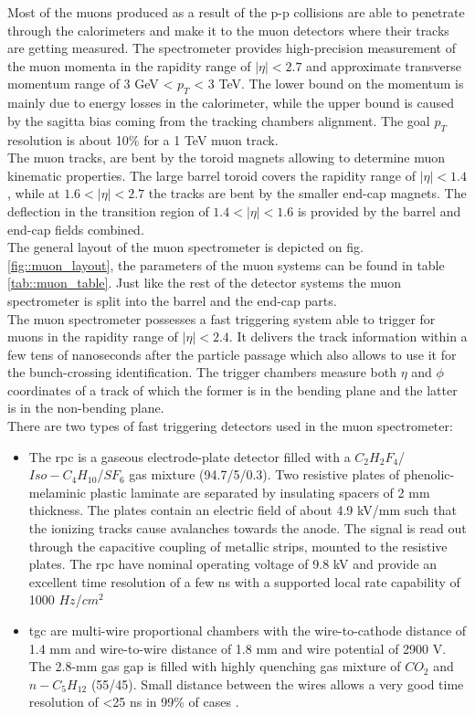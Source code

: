 	Most of the muons produced as a result of the p-p collisions are able to penetrate through the calorimeters and make it to the muon detectors where their tracks are getting measured. The spectrometer provides high-precision measurement of the muon momenta in the rapidity range of $|\eta| < 2.7$ and approximate transverse momentum range of 3 GeV < $p_T$ < 3 TeV. The lower bound on the momentum is mainly due to energy losses in the calorimeter, while the upper bound is caused by the sagitta bias coming from the tracking chambers alignment. The goal $p_T$ resolution is about 10\% for a 1 TeV muon track. \\
	The muon tracks\cite{muons_1},\cite{muons_2}  are bent by the toroid magnets allowing to determine muon kinematic properties. The large barrel toroid covers the rapidity range of $|\eta| < 1.4$, while at  $1.6 < |\eta| < 2.7$ the tracks are bent by the smaller end-cap magnets. The deflection in the transition region of $1.4 < |\eta| < 1.6$ is provided by the barrel and end-cap fields combined.\\
	The general layout of the muon spectrometer is depicted on fig. \ref{fig::muon_layout}, the parameters of the muon systems can be found in table \ref{tab::muon_table}. Just like the rest of the detector systems the muon spectrometer is split into the barrel and the end-cap parts. \\ 
	The muon spectrometer possesses a fast triggering system able to trigger for muons in the rapidity range of $|\eta| < 2.4$. It delivers the track information within a few tens of nanoseconds after the particle passage which also allows to use it for the bunch-crossing identification. The trigger chambers measure both $\eta$ and $\phi$ coordinates of a track of which the former is in the bending plane and the latter is in the non-bending plane.\\ 
	There are two types of fast triggering detectors used in the muon spectrometer:
		\begin{itemize}
		\item The \gls{rpc} is a gaseous electrode-plate detector filled with a $C_2H_2F_4$/$Iso-C_4H_{10}$/$SF_6$ gas mixture (94.7/5/0.3). Two resistive plates of phenolic-melaminic plastic laminate are separated by insulating spacers of 2 mm thickness. The plates contain an electric field of about 4.9 kV/mm such that the ionizing tracks cause avalanches towards the anode. The signal is read out through the capacitive coupling of metallic strips, mounted to the resistive plates. The \gls{rpc} have nominal operating voltage of 9.8 kV and provide an excellent time resolution of a few ns with a supported local rate capability of 1000 $Hz$/$cm^2$
		\item \gls{tgc} are multi-wire proportional chambers with the wire-to-cathode distance of 1.4 mm and wire-to-wire distance of 1.8 mm and wire potential of 2900 V. The 2.8-mm gas gap is filled with highly quenching gas mixture of $CO_2$ and $n-C_5H_{12}$ (55/45). Small distance between the wires allows a very good time resolution of <25 ns in 99\% of cases .
	\end{itemize} 
